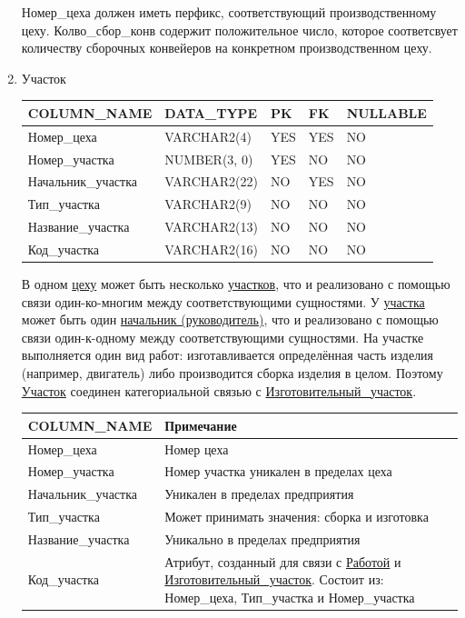 \begin{enumerate}
\begin{tabular}{|p{7cm}|p{3cm}|p{1cm}|p{1cm}|p{3cm}|}
    \end{tabular}

    Номер\_цеха должен иметь перфикс, соответствующий производственному цеху.
    Колво\_сбор\_конв содержит положительное число, которое соответсвует количеству сборочных конвейеров на конкретном производственном цеху.

    \item{Участок}

    \begin{tabular}{|p{7cm}|p{3cm}|p{1cm}|p{1cm}|p{3cm}|} \hline

        {\bf COLUMN\_NAME} & {\bf DATA\_TYPE} & {\bf PK} & {\bf FK} & {\bf NULLABLE} \\ \hline
        Номер\_цеха & VARCHAR2(4) & YES & YES & NO \\ \hline
        Номер\_участка & NUMBER(3, 0) & YES & NO & NO \\ \hline
        Начальник\_участка & VARCHAR2(22) & NO & YES & NO \\ \hline
        Тип\_участка & VARCHAR2(9) & NO & NO & NO \\ \hline
        Название\_участка & VARCHAR2(13) & NO & NO & NO \\ \hline
        Код\_участка & VARCHAR2(16) & NO & NO & NO \\ \hline

    \end{tabular}

    В одном \underline{цеху} может быть несколько \underline{участков}, что и реализовано с помощью связи один-ко-многим между соответствующими сущностями.
    У \underline{участка} может быть один \underline{начальник (руководитель)}, что и реализовано с помощью связи один-к-одному между соответствующими сущностями.
    На участке выполняется один вид работ: изготавливается определённая часть изделия (например, двигатель) либо производится сборка изделия в целом.
    Поэтому \underline{Участок} соединен категориальной связью с \underline{Изготовительный\_участок}.

    \begin{tabular}{|p{7cm}|p{9.3cm}|} \hline

        {\bf COLUMN\_NAME} & {\bf Примечание} \\ \hline
        Номер\_цеха & Номер цеха \\ \hline
        Номер\_участка & Номер участка уникален в пределах цеха \\ \hline
        Начальник\_участка & Уникален в пределах предприятия \\ \hline
        Тип\_участка & Может принимать значения: сборка и изготовка \\ \hline
        Название\_участка & Уникально в пределах предприятия \\ \hline
        Код\_участка & Атрибут, созданный для связи с \underline{Работой} и \underline{Изготовительный\_участок}. Состоит из: Номер\_цеха, Тип\_участка и Номер\_участка \\ \hline


\end{tabular}
\end{enumerate}
